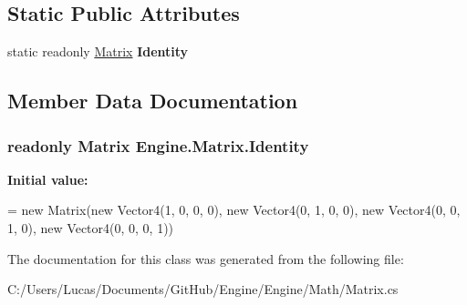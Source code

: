 \subsection*{Static Public Attributes}
\begin{DoxyCompactItemize}
\item 
static readonly \hyperlink{class_engine_1_1_matrix}{Matrix} {\bfseries Identity}
\end{DoxyCompactItemize}


\subsection{Member Data Documentation}
\hypertarget{class_engine_1_1_matrix_a7dbeeeb10cd6efe90b28776ed18c5f29}{
\subsubsection[{Identity}]{\setlength{\rightskip}{0pt plus 5cm}readonly {\bf Matrix} Engine.\-Matrix.\-Identity\hspace{0.3cm}{\ttfamily [static]}}}\label{class_engine_1_1_matrix_a7dbeeeb10cd6efe90b28776ed18c5f29}
{\bfseries Initial value\-:}
\begin{DoxyCode}
= \textcolor{keyword}{new} Matrix(\textcolor{keyword}{new} Vector4(1, 0, 0, 0),
                                                             \textcolor{keyword}{new} Vector4(0, 1, 0, 0),
                                                             \textcolor{keyword}{new} Vector4(0, 0, 1, 0),
                                                             \textcolor{keyword}{new} Vector4(0, 0, 0, 1))
\end{DoxyCode}


The documentation for this class was generated from the following file\-:\begin{DoxyCompactItemize}
\item 
C\-:/\-Users/\-Lucas/\-Documents/\-Git\-Hub/\-Engine/\-Engine/\-Math/Matrix.\-cs\end{DoxyCompactItemize}
